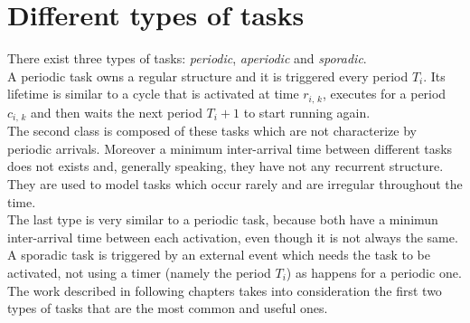 \section{Different types of tasks}
There exist three types of tasks: \emph{periodic}, \emph{aperiodic} and \emph{sporadic}.\\
A periodic task owns a regular structure and it is triggered every period \( T_{i} \). Its lifetime is similar to a cycle that is activated at time \( r_{i,\,k} \), executes for a period \( c_{i,\,k} \) and then waits the next period \( T_{i}+1 \) to start running again.\\
The second class is composed of these tasks which are not characterize by periodic arrivals. Moreover a minimum inter-arrival time between different tasks does not exists and, generally speaking, they have not any recurrent structure. They are used to model tasks which occur rarely and are irregular throughout the time.\\
The last type is very similar to a periodic task, because both have a minimun inter-arrival time between each activation, even though it is not always the same. A sporadic task is triggered by an external event which needs the task to be activated, not using a timer (namely the period \( T_{i} \)) as happens for a periodic one.\\
The work described in following chapters takes into consideration the first two types of tasks that are the most common and useful ones.


